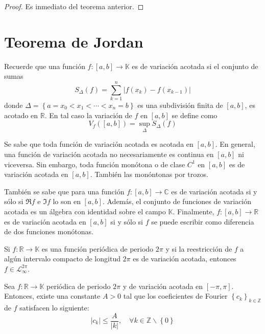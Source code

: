 \documentclass[12pt]{report}
\newcounter{it}
\theoremstyle{largebreak}
\renewcommand{\leq}{\ensuremath{\leqslant}}
\newcommand\abs[1]{\ensuremath{\left|#1\right|}}
\newcommand\cf[3]{\ensuremath{#1:#2\rightarrow#3}}
\begin{document}
    \begin{proof}
        Es inmediato del teorema anterior.
    \end{proof}

    \section{Teorema de Jordan}

    Recuerde que una función $\cf{f}{[a,b]}{\mathbb{K}}$ es de variación acotada si el conjunto de sumas
    \begin{equation*}
        S_\Delta(f)=\sum_{ k=1}^n\abs{f(x_k)-f(x_{ k-1})}
    \end{equation*}
    donde $\Delta=\left\{a=x_0<x_1<\cdots<x_n=b \right\}$ es una subdivisión finita de $[a,b]$, es acotado en $\mathbb{R}$. En tal caso la variación de $f$ en $[a,b]$ se define como
    \begin{equation*}
        V_f([a,b])=\sup_{\Delta}S_\Delta(f)
    \end{equation*}

    Se sabe que toda función de variación acotada es acotada en $[a,b]$. En general, una función de variación acotada no necesariamente es continua en $[a,b]$ ni viceversa. Sin embargo, toda función monótona o de clase $C^1$ en $[a,b]$ es de variación acotada en $[a,b]$. También las monóntonas por trozos.

    También se sabe que para una función $\cf{f}{[a,b]}{\mathbb{C}}$ es de variación acotada si y sólo si $\Re f$ e $\Im f$ lo son en $[a,b]$. Además, el conjunto de funciones de variación acotada es un álgebra con identidad sobre el campo $\mathbb{K}$. Finalmente, $\cf{f}{[a,b]}{\mathbb{R}}$ es de variación acotada en $[a,b]$ si y sólo si $f$ se puede escribir como diferencia de dos funciones monótonas.

    \begin{obs}
        Si $\cf{f}{\mathbb{R}}{\mathbb{K}}$ es una función periódica de periodo $2\pi$ y si la reestricción de $f$ a algún intervalo compacto de longitud $2\pi$ es de variación acotada, entonces $f\in\mathcal{L}_{\infty}^{2\pi}$.
    \end{obs}

    \begin{lema}
        Sea $\cf{f}{\mathbb{R}}{\mathbb{K}}$ periódica de periodo $2\pi$ y de variación acotada en $[-\pi,\pi]$. Entonces, existe una constante $A>0$ tal que los coeficientes de Fourier $\left\{c_k \right\}_{ k\in\mathbb{Z}}$ de $f$ satisfacen lo siguiente:
        \begin{equation*}
            \abs{c_k}\leq\frac{A}{\abs{k}},\quad\forall k\in\mathbb{Z}\backslash\left\{0\right\}
        \end{equation*} 
    \end{lema}
\end{document}
